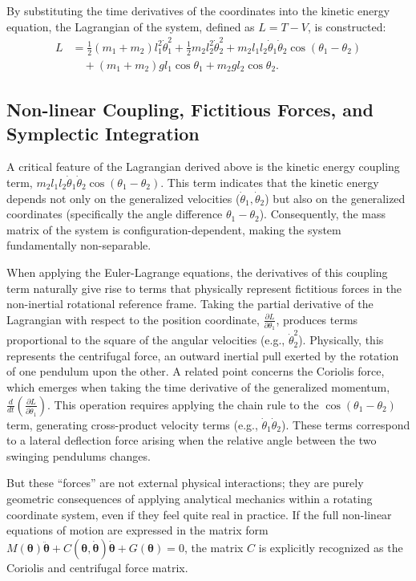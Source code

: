 \documentclass[12pt, a4paper, twoside]{article}
\begin{document}
By substituting the time derivatives of the coordinates into the kinetic energy equation, the Lagrangian of the system, defined as $L = T - V$, is constructed:
\begin{equation}
\begin{aligned}
L &= \frac{1}{2}(m_1 + m_2)l_1^2\dot{\theta}_1^2 + \frac{1}{2}m_2 l_2^2 \dot{\theta}_2^2 + m_2 l_1 l_2 \dot{\theta}_1 \dot{\theta}_2 \cos(\theta_1 - \theta_2) \\
  &\quad + (m_1 + m_2)g l_1 \cos\theta_1 + m_2 g l_2 \cos\theta_2.
\end{aligned}
\end{equation}

\subsection{Non-linear Coupling, Fictitious Forces, and Symplectic Integration}
A critical feature of the Lagrangian derived above is the kinetic energy coupling term, $m_2 l_1 l_2 \dot{\theta}_1 \dot{\theta}_2 \cos(\theta_1 - \theta_2)$. This term indicates that the kinetic energy depends not only on the generalized velocities ($\dot{\theta}_1, \dot{\theta}_2$) but also on the generalized coordinates (specifically the angle difference $\theta_1 - \theta_2$). Consequently, the mass matrix of the system is configuration-dependent, making the system fundamentally non-separable.

When applying the Euler-Lagrange equations, the derivatives of this coupling term naturally give rise to terms that physically represent fictitious forces in the non-inertial rotational reference frame. Taking the partial derivative of the Lagrangian with respect to the position coordinate, $\frac{\partial L}{\partial \theta_1}$, produces terms proportional to the square of the angular velocities (e.g., $\dot{\theta}_2^2$). Physically, this represents the centrifugal force, an outward inertial pull exerted by the rotation of one pendulum upon the other. A related point concerns the Coriolis force, which emerges when taking the time derivative of the generalized momentum, $\frac{d}{dt}\left(\frac{\partial L}{\partial \dot{\theta}_1}\right)$. This operation requires applying the chain rule to the $\cos(\theta_1 - \theta_2)$ term, generating cross-product velocity terms (e.g., $\dot{\theta}_1 \dot{\theta}_2$). These terms correspond to a lateral deflection force arising when the relative angle between the two swinging pendulums changes.

But these ``forces'' are not external physical interactions; they are purely geometric consequences of applying analytical mechanics within a rotating coordinate system, even if they feel quite real in practice. If the full non-linear equations of motion are expressed in the matrix form $M(\mathbf{\theta})\ddot{\mathbf{\theta}} + C(\mathbf{\theta}, \dot{\mathbf{\theta}})\dot{\mathbf{\theta}} + G(\mathbf{\theta}) = 0$, the matrix $C$ is explicitly recognized as the Coriolis and centrifugal force matrix.
\end{document}
